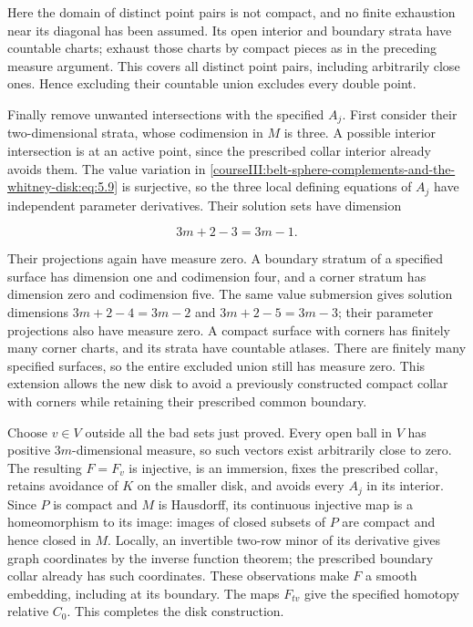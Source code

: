 Here the domain of distinct point pairs is not compact, and no finite exhaustion near its diagonal has been assumed. Its open interior and boundary strata have countable charts; exhaust those charts by compact pieces as in the preceding measure argument. This covers all distinct point pairs, including arbitrarily close ones. Hence excluding their countable union excludes every double point.

Finally remove unwanted intersections with the specified \(A_j\). First consider their two-dimensional strata, whose codimension in \(M\) is three. A possible interior intersection is at an active point, since the prescribed collar interior already avoids them. The value variation in \eqref{courseIII:belt-sphere-complements-and-the-whitney-disk:eq:5.9} is surjective, so the three local defining equations of \(A_j\) have independent parameter derivatives. Their solution sets have dimension

\begin{equation}
3m+2-3=3m-1.
\label{courseIII:belt-sphere-complements-and-the-whitney-disk:eq:5.13}
\end{equation}

Their projections again have measure zero. A boundary stratum of a specified surface has dimension one and codimension four, and a corner stratum has dimension zero and codimension five. The same value submersion gives solution dimensions \(3m+2-4=3m-2\) and \(3m+2-5=3m-3\); their parameter projections also have measure zero. A compact surface with corners has finitely many corner charts, and its strata have countable atlases. There are finitely many specified surfaces, so the entire excluded union still has measure zero. This extension allows the new disk to avoid a previously constructed compact collar with corners while retaining their prescribed common boundary.

Choose \(v\in V\) outside all the bad sets just proved. Every open ball in \(V\) has positive \(3m\)-dimensional measure, so such vectors exist arbitrarily close to zero. The resulting \(F=F_v\) is injective, is an immersion, fixes the prescribed collar, retains avoidance of \(K\) on the smaller disk, and avoids every \(A_j\) in its interior. Since \(P\) is compact and \(M\) is Hausdorff, its continuous injective map is a homeomorphism to its image: images of closed subsets of \(P\) are compact and hence closed in \(M\). Locally, an invertible two-row minor of its derivative gives graph coordinates by the inverse function theorem; the prescribed boundary collar already has such coordinates. These observations make \(F\) a smooth embedding, including at its boundary. The maps \(F_{tv}\) give the specified homotopy relative \(C_0\). This completes the disk construction.


